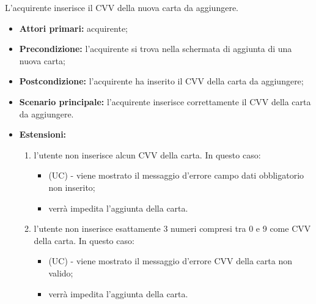 L'acquirente inserisce il CVV della nuova carta da aggiungere.
\begin{itemize}
    \item \textbf{Attori primari:} acquirente;
    \item \textbf{Precondizione:} l'acquirente si trova nella schermata di aggiunta di una nuova carta;
    \item \textbf{Postcondizione:} l'acquirente ha inserito il CVV della carta da aggiungere;
    \item \textbf{Scenario principale:} l'acquirente inserisce correttamente il CVV della carta da aggiungere.
    \item \textbf{Estensioni:}
    \begin{enumerate}[label=\lett]
        \item l'utente non inserisce alcun CVV della carta. In questo caso:
        \begin{itemize}
            \item (UC) - viene mostrato il messaggio d'errore campo dati obbligatorio non inserito;
            \item verrà impedita l'aggiunta della carta.
        \end{itemize}
        \item l'utente non inserisce esattamente 3 numeri compresi tra 0 e 9 come CVV della carta. In questo caso:
        \begin{itemize}
            \item (UC) - viene mostrato il messaggio d'errore CVV della carta non valido;
            \item verrà impedita l'aggiunta della carta.
        \end{itemize}
    \end{enumerate}
\end{itemize}

